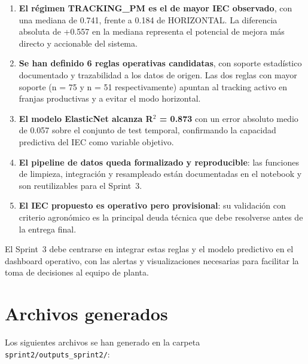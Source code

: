 \documentclass[12pt,a4paper]{article}
\begin{document}
\begin{enumerate}
    \item \textbf{El régimen TRACKING\_PM es el de mayor IEC observado}, con una
        mediana de 0.741, frente a 0.184 de HORIZONTAL. La diferencia absoluta de
        +0.557 en la mediana representa el potencial de mejora más directo y accionable
        del sistema.

    \item \textbf{Se han definido 6 reglas operativas candidatas}, con soporte
        estadístico documentado y trazabilidad a los datos de origen. Las dos reglas
        con mayor soporte (n = 75 y n = 51 respectivamente) apuntan al tracking activo
        en franjas productivas y a evitar el modo horizontal.

    \item \textbf{El modelo ElasticNet alcanza R$^2$ = 0.873} con un error absoluto medio
        de 0.057 sobre el conjunto de test temporal, confirmando la capacidad predictiva
        del IEC como variable objetivo.

    \item \textbf{El pipeline de datos queda formalizado y reproducible}: las funciones
        de limpieza, integración y resampleado están documentadas en el notebook y son
        reutilizables para el Sprint~3.

    \item \textbf{El IEC propuesto es operativo pero provisional}: su validación con
        criterio agronómico es la principal deuda técnica que debe resolverse antes
        de la entrega final.

\end{enumerate}

El Sprint~3 debe centrarse en integrar estas reglas y el modelo predictivo en el
dashboard operativo, con las alertas y visualizaciones necesarias para facilitar la
toma de decisiones al equipo de planta.

\newpage
\appendix
\section{Archivos generados}

Los siguientes archivos se han generado en la carpeta \texttt{sprint2/outputs\_sprint2/}:
\end{document}
